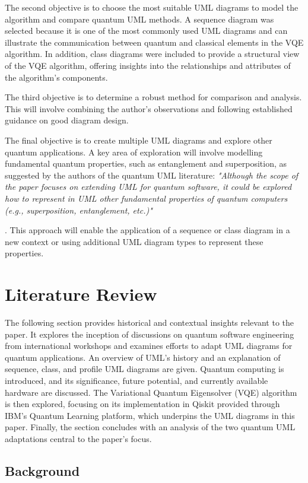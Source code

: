 \documentclass{article}
\begin{document}
The second objective is to choose the most suitable UML diagrams to model the algorithm and compare quantum UML methods. A sequence diagram was selected because it is one of the most commonly used UML diagrams and can illustrate the communication between quantum and classical elements in the VQE algorithm. In addition, class diagrams were included to provide a structural view of the VQE algorithm, offering insights into the relationships and attributes of the algorithm's components.

The third objective is to determine a robust method for comparison and analysis. This will involve combining the author’s observations and following established guidance on good diagram design.

The final objective is to create multiple UML diagrams and explore other quantum applications. A key area of exploration will involve modelling fundamental quantum properties, such as entanglement and superposition, as suggested by the authors of the quantum UML literature: \textit{"Although the scope of the paper focuses on extending UML for quantum software, it
could be explored how to represent in UML other fundamental properties of quantum
computers (e.g., superposition, entanglement, etc.)"}{\cite{Pérez-Castillo2022}. This approach will enable the application of a sequence or class diagram in a new context or using additional UML diagram types to represent these properties.

\section{Literature Review}

The following section provides historical and contextual insights relevant to the paper. It explores the inception of discussions on quantum software engineering from international workshops and examines efforts to adapt UML diagrams for quantum applications. An overview of UML's history and an explanation of sequence, class, and profile UML diagrams are given. Quantum computing is introduced, and its significance, future potential, and currently available hardware are discussed. The Variational Quantum Eigensolver (VQE) algorithm is then explored, focusing on its implementation in Qiskit provided through IBM's Quantum Learning platform, which underpins the UML diagrams in this paper. Finally, the section concludes with an analysis of the two quantum UML adaptations central to the paper's focus.

\subsection{Background}

}
\end{document}
